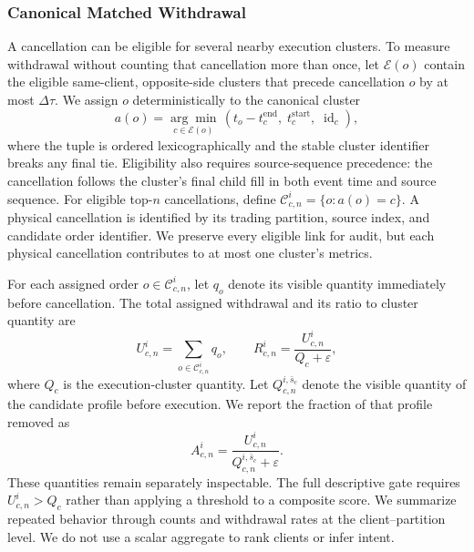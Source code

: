 \documentclass[11pt]{article}
\begin{document}
\subsubsection{Canonical Matched Withdrawal}
\label{subsec:canonical_matched_withdrawal}

A cancellation can be eligible for several nearby execution clusters. To measure withdrawal without counting that
cancellation more than once, let $\mathcal E(o)$ contain the eligible same-client, opposite-side clusters that precede
cancellation $o$ by at most $\Delta\tau$. We assign $o$ deterministically to the canonical cluster
\begin{equation}
    a(o)=\underset{c\in\mathcal E(o)}{\arg\min}\,
    \left(t_o-t_c^{\mathrm{end}},\;t_c^{\mathrm{start}},\;\operatorname{id}_c\right),
    \label{eq:canonical_cancel_assignment}
\end{equation}
where the tuple is ordered lexicographically and the stable cluster identifier breaks any final tie. Eligibility also
requires source-sequence precedence: the cancellation follows the cluster's final child fill in both event time and source
sequence. For eligible top-$n$ cancellations, define $\mathcal{C}_{c,n}^{i}=\{o:a(o)=c\}$. A physical cancellation is
identified by its trading partition, source index, and candidate order identifier. We preserve every eligible link for
audit, but each physical cancellation contributes to at most one cluster's metrics.

For each assigned order $o\in\mathcal{C}_{c,n}^{i}$, let $q_o$ denote its visible quantity immediately before
cancellation. The total assigned withdrawal and its ratio to cluster quantity are
\begin{equation}
    U^{i}_{c,n}=\sum_{o\in\mathcal{C}_{c,n}^{i}}q_o,
    \qquad
    R^{i}_{c,n}=\frac{U^{i}_{c,n}}{Q_c+\varepsilon},
    \label{eq:assigned_withdrawal}
\end{equation}
where $Q_c$ is the execution-cluster quantity. Let $Q^{i,\bar{s}_c}_{c,n}$ denote the visible quantity of the candidate
profile before execution. We report the fraction of that profile removed as
\begin{equation}
    A^{i}_{c,n}
    =\frac{U^{i}_{c,n}}{Q^{i,\bar{s}_c}_{c,n}+\varepsilon}.
    \label{eq:assigned_withdrawal_share}
\end{equation}
These quantities remain separately inspectable. The full descriptive gate requires $U^{i}_{c,n}>Q_c$ rather than applying
a threshold to a composite score. We summarize repeated behavior through counts and withdrawal rates at the
client--partition level. We do not use a scalar aggregate to rank clients or infer intent.
\end{document}
